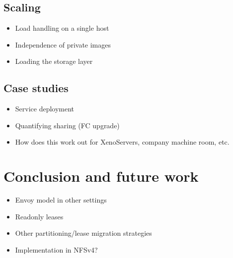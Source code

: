 \documentclass[a4paper,12pt]{article}
\begin{document}
\subsection{Scaling}
\begin{itemize}
\item Load handling on a single host
\item Independence of private images
\item Loading the storage layer
\end{itemize}
\subsection{Case studies}
\begin{itemize}
\item Service deployment
\item Quantifying sharing (FC upgrade)
\item How does this work out for XenoServers, company machine room, etc.
\end{itemize}


\section{Conclusion and future work}
\begin{itemize}
\item Envoy model in other settings
\item Readonly leases
\item Other partitioning/lease migration strategies
\item Implementation in NFSv4?
\end{itemize}

\nocite{*}

\end{document}
